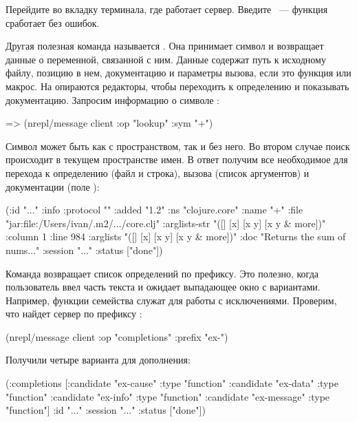 Перейдите во вкладку терминала, где работает сервер. Введите ~--- функция сработает без ошибок.

Другая полезная команда называется . Она принимает символ и возвращает данные о переменной, связанной с ним. Данные содержат путь к исходному файлу, позицию в нем, документацию и параметры вызова, если это функция или макрос. На  опираются редакторы, чтобы переходить к определению и показывать документацию. Запросим информацию о символе \code{+}:

\begin{english}
  \begin{clojure}
=> (nrepl/message client {:op "lookup" :sym "+"})
  \end{clojure}
\end{english}

Символ может быть как с пространством, так и без него. Во втором случае поиск происходит в текущем пространстве имен. В ответ получим все необходимое для перехода к определению (файл и строка), вызова (список аргументов) и документации (поле ):

\begin{english}
  \begin{clojure}
({:id "..."
  :info {:protocol ""
         :added "1.2"
         :ns "clojure.core"
         :name "+"
         :file "jar:file:/Users/ivan/.m2/.../core.clj"
         :arglists-str "([] [x] [x y] [x y & more])"
         :column 1
         :line 984
         :arglists "([] [x] [x y] [x y & more])"
         :doc "Returns the sum of nums..."}
  :session "..."
  :status ["done"]})
  \end{clojure}
\end{english}

Команда  возвращает список определений по префиксу. Это полезно, когда пользователь ввел часть текста и ожидает выпадающее окно с вариантами. Например, функции семейства  служат для работы с исключениями. Проверим, что найдет сервер по префиксу :

\begin{english}
  \begin{clojure}
(nrepl/message client
               {:op "completions" :prefix "ex-"})
  \end{clojure}
\end{english}

Получили четыре варианта для дополнения:

\begin{english}
  \begin{clojure}
({:completions
  [{:candidate "ex-cause" :type "function"}
   {:candidate "ex-data" :type "function"}
   {:candidate "ex-info" :type "function"}
   {:candidate "ex-message" :type "function"}]
  :id "..."
  :session "..."
  :status ["done"]})
  \end{clojure}
\end{english}


